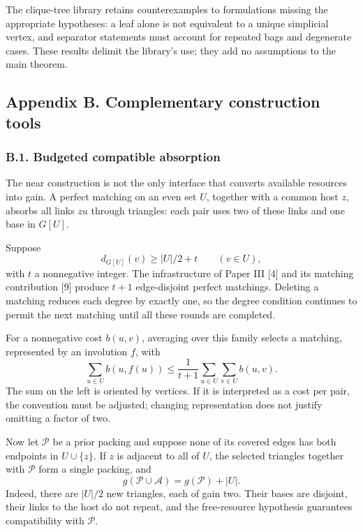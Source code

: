 \documentclass[english,11pt,a4paper]{article}
\newcounter{none}
\begin{document}
The clique-tree library retains counterexamples to formulations missing the appropriate hypotheses: a leaf alone is not equivalent to a unique simplicial vertex, and separator statements must account for repeated bags and degenerate cases. These results delimit the library's use; they add no assumptions to the main theorem.

\subsection{Appendix B. Complementary construction tools}\label{appendix-b.-complementary-construction-tools}

\subsubsection{B.1. Budgeted compatible absorption}\label{b.1.-budgeted-compatible-absorption}

The near construction is not the only interface that converts available resources into gain. A perfect matching on an even set \(U\), together with a common host \(z\), absorbs all links \(zu\) through triangles: each pair uses two of these links and one base in \(G[U]\).

Suppose \[
d_{G[U]}(v)\ge |U|/2+t\qquad(v\in U),
\tag{B.1}
\] with \(t\) a nonnegative integer. The infrastructure of Paper III {[}4{]} and its matching contribution {[}9{]} produce \(t+1\) edge-disjoint perfect matchings. Deleting a matching reduces each degree by exactly one, so the degree condition continues to permit the next matching until all these rounds are completed.

For a nonnegative cost \(b(u,v)\), averaging over this family selects a matching, represented by an involution \(f\), with \[
\sum_{u\in U}b(u,f(u))
\le\frac1{t+1}\sum_{u\in U}\sum_{v\in U}b(u,v).
\tag{B.2}
\] The sum on the left is oriented by vertices. If it is interpreted as a cost per pair, the convention must be adjusted; changing representation does not justify omitting a factor of two.

Now let \(\mathcal P\) be a prior packing and suppose none of its covered edges has both endpoints in \(U\cup\{z\}\). If \(z\) is adjacent to all of \(U\), the selected triangles together with \(\mathcal P\) form a single packing, and \[
g(\mathcal P\cup\mathcal A)=g(\mathcal P)+|U|.
\tag{B.3}
\] Indeed, there are \(|U|/2\) new triangles, each of gain two. Their bases are disjoint, their links to the host do not repeat, and the free-resource hypothesis guarantees compatibility with \(\mathcal P\).
\end{document}
